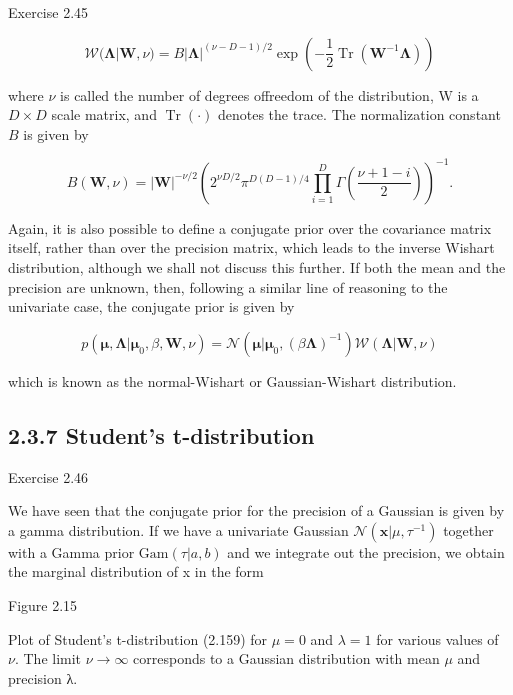 \documentclass[
  10
]{article}
\begin{document}
Exercise 2.45

\[
\mathcal {W} (\boldsymbol {\Lambda} | \mathbf {W}, \nu) = B | \boldsymbol {\Lambda} | ^ {(\nu - D - 1) / 2} \exp \left(- \frac {1}{2} \operatorname{Tr} \left(\mathbf {W} ^ {- 1} \boldsymbol {\Lambda}\right)\right)\tag{2.155}
\]

where \(\nu\) is called the number of degrees offreedom of the
distribution, W is a \(D \times D\) scale matrix, and
\(\operatorname { T r } ( \cdot )\) denotes the trace. The normalization
constant \(B\) is given by

\[
B (\mathbf {W}, \nu) = | \mathbf {W} | ^ {- \nu / 2} \left(2 ^ {\nu D / 2} \pi^ {D (D - 1) / 4} \prod_ {i = 1} ^ {D} \Gamma \left(\frac {\nu + 1 - i}{2}\right)\right) ^ {- 1}.\tag{2.156}
\]

Again, it is also possible to define a conjugate prior over the
covariance matrix itself, rather than over the precision matrix, which
leads to the inverse Wishart distribution, although we shall not discuss
this further. If both the mean and the precision are unknown, then,
following a similar line of reasoning to the univariate case, the
conjugate prior is given by

\[
p (\boldsymbol {\mu}, \boldsymbol {\Lambda} | \boldsymbol {\mu} _ {0}, \beta , \mathbf {W}, \nu) = \mathcal {N} (\boldsymbol {\mu} | \boldsymbol {\mu} _ {0}, (\beta \boldsymbol {\Lambda}) ^ {- 1}) \mathcal {W} (\boldsymbol {\Lambda} | \mathbf {W}, \nu)\tag{2.157}
\]

which is known as the normal-Wishart or Gaussian-Wishart distribution.

\subsection{2.3.7 Student's
t-distribution}\label{students-t-distribution}

Exercise 2.46

We have seen that the conjugate prior for the precision of a Gaussian is
given by a gamma distribution. If we have a univariate Gaussian
\(\mathcal { N } ( \boldsymbol { x } | \mu , \tau ^ { - 1 } )\) together
with a Gamma prior \({ \mathrm { G a m } } ( \tau | a , b )\) and we
integrate out the precision, we obtain the marginal distribution of x in
the form

Figure 2.15

Plot of Student's t-distribution (2.159) for \(\mu = 0\) and
\(\lambda = 1\) for various values of \(\nu .\) The limit
\(\nu \to \infty\) corresponds to a Gaussian distribution with mean
\(\mu\) and precision λ.
\end{document}
